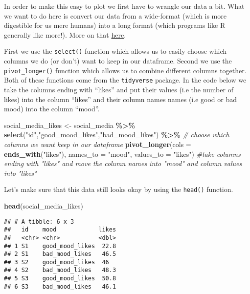 \documentclass[
]{book}
\newenvironment{Shaded}{\begin{snugshade}}{\end{snugshade}}
\newcommand{\AttributeTok}[1]{\textcolor[rgb]{0.13,0.29,0.53}{#1}}
\newcommand{\CommentTok}[1]{\textcolor[rgb]{0.56,0.35,0.01}{\textit{#1}}}
\newcommand{\FunctionTok}[1]{\textcolor[rgb]{0.13,0.29,0.53}{\textbf{#1}}}
\newcommand{\NormalTok}[1]{#1}
\newcommand{\OtherTok}[1]{\textcolor[rgb]{0.56,0.35,0.01}{#1}}
\newcommand{\SpecialCharTok}[1]{\textcolor[rgb]{0.81,0.36,0.00}{\textbf{#1}}}
\newcommand{\StringTok}[1]{\textcolor[rgb]{0.31,0.60,0.02}{#1}}
\begin{document}
In order to make this easy to plot we first have to wrangle our data a bit. What we want to do here is convert our data from a wide-format (which is more digestible for us mere humans) into a long format (which programs like R generally like more!). More on that \href{https://www.statology.org/long-vs-wide-data/}{here}.

First we use the \texttt{select()} function which allows us to easily choose which columns we do (or don't) want to keep in our dataframe. Second we use the \texttt{pivot\_longer()} function which allows us to combine different columns together. Both of these functions come from the \texttt{tidyverse} package. In the code below we take the columns ending with ``likes'' and put their values (i.e the number of likes) into the column ``likes'' and their column names names (i.e good or bad mood) into the column ``mood''.

\begin{Shaded}
\begin{Highlighting}[]
\NormalTok{social\_media\_likes }\OtherTok{\textless{}{-}}\NormalTok{ social\_media }\SpecialCharTok{\%\textgreater{}\%} 
  \FunctionTok{select}\NormalTok{(}\StringTok{"id"}\NormalTok{,}\StringTok{"good\_mood\_likes"}\NormalTok{,}\StringTok{"bad\_mood\_likes"}\NormalTok{) }\SpecialCharTok{\%\textgreater{}\%} \CommentTok{\# choose which columns we want keep in our dataframe}
  \FunctionTok{pivot\_longer}\NormalTok{(}\AttributeTok{cols =} \FunctionTok{ends\_with}\NormalTok{(}\StringTok{"likes"}\NormalTok{), }\AttributeTok{names\_to =} \StringTok{"mood"}\NormalTok{, }\AttributeTok{values\_to =} \StringTok{"likes"}\NormalTok{) }\CommentTok{\#take columns ending with "likes" and move the column names into "mood" and column values into "likes"}
\end{Highlighting}
\end{Shaded}

Let's make sure that this data still looks okay by using the \texttt{head()} function.

\begin{Shaded}
\begin{Highlighting}[]
\FunctionTok{head}\NormalTok{(social\_media\_likes)}
\end{Highlighting}
\end{Shaded}

\begin{verbatim}
## # A tibble: 6 x 3
##   id    mood            likes
##   <chr> <chr>           <dbl>
## 1 S1    good_mood_likes  22.8
## 2 S1    bad_mood_likes   46.5
## 3 S2    good_mood_likes  46  
## 4 S2    bad_mood_likes   48.3
## 5 S3    good_mood_likes  50.8
## 6 S3    bad_mood_likes   46.1
\end{verbatim}
\end{document}
